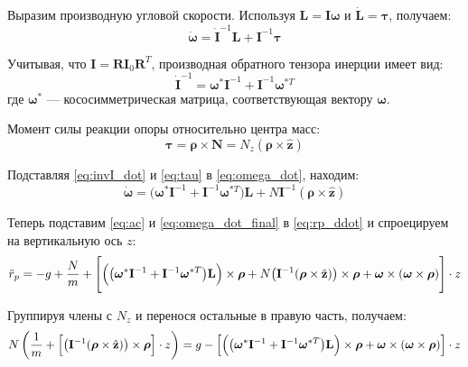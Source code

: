 \documentclass{article}
\begin{document}
Выразим производную угловой скорости. 
Используя $\mathbf{L} = \mathbf{I} \boldsymbol{\omega}$ и $\dot{\mathbf{L}} = \boldsymbol{\tau}$, получаем:
\begin{equation}
\dot{\boldsymbol{\omega}} = \dot{\mathbf{I}}^{-1} \mathbf{L} + \mathbf{I}^{-1} \boldsymbol{\tau} \label{eq:omega_dot}
\end{equation}

Учитывая, что $\mathbf{I} = \mathbf{R} \mathbf{I}_0 \mathbf{R}^T$, производная обратного тензора инерции имеет вид:
\begin{equation}
\dot{\mathbf{I}}^{-1} = \boldsymbol{\omega}^* \mathbf{I}^{-1} + \mathbf{I}^{-1} \boldsymbol{\omega}^{*T} \label{eq:invI_dot}
\end{equation}
где $\boldsymbol{\omega}^*$ --- кососимметрическая матрица, соответствующая вектору $\boldsymbol{\omega}$.

Момент силы реакции опоры относительно центра масс:
\begin{equation}
\boldsymbol{\tau} = \boldsymbol{\rho} \times \mathbf{N} = N_z (\boldsymbol{\rho} \times \hat{\mathbf{z}}) \label{eq:tau}
\end{equation}

Подставляя \eqref{eq:invI_dot} и \eqref{eq:tau} в \eqref{eq:omega_dot}, находим:
\begin{equation}
\dot{\boldsymbol{\omega}} = \bigl( \boldsymbol{\omega}^* \mathbf{I}^{-1} + \mathbf{I}^{-1} \boldsymbol{\omega}^{*T} \bigr) \mathbf{L} + N \mathbf{I}^{-1} (\boldsymbol{\rho} \times \hat{\mathbf{z}}) \label{eq:omega_dot_final}
\end{equation}


Теперь подставим \eqref{eq:ac} и \eqref{eq:omega_dot_final} в \eqref{eq:rp_ddot} и спроецируем на вертикальную ось $z$:
\begin{equation}
\ddot{r}_p = -g + \frac{N}{m} + \Biggl[ \Bigl( \bigl( \boldsymbol{\omega}^* \mathbf{I}^{-1} + \mathbf{I}^{-1} \boldsymbol{\omega}^{*T} \bigr) \mathbf{L} \Bigr) \times \boldsymbol{\rho} + N \bigl( \mathbf{I}^{-1} (\boldsymbol{\rho} \times \hat{\mathbf{z}}) \bigr) \times \boldsymbol{\rho} + \boldsymbol{\omega} \times (\boldsymbol{\omega} \times \boldsymbol{\rho}) \Biggr] \cdot z \label{eq:z_ddot}
\end{equation}

Группируя члены с $N_z$ и перенося остальные в правую часть, получаем:
\begin{equation}
N \left( \frac{1}{m} + \Bigl[ \bigl( \mathbf{I}^{-1} (\boldsymbol{\rho} \times \hat{\mathbf{z}}) \bigr) \times \boldsymbol{\rho} \Bigr] \cdot z \right) = g - \Bigl[ \Bigl( \bigl( \boldsymbol{\omega}^* \mathbf{I}^{-1} + \mathbf{I}^{-1} \boldsymbol{\omega}^{*T} \bigr) \mathbf{L} \Bigr) \times \boldsymbol{\rho} + \boldsymbol{\omega} \times (\boldsymbol{\omega} \times \boldsymbol{\rho}) \Bigr] \cdot z
\end{equation}
\end{document}
